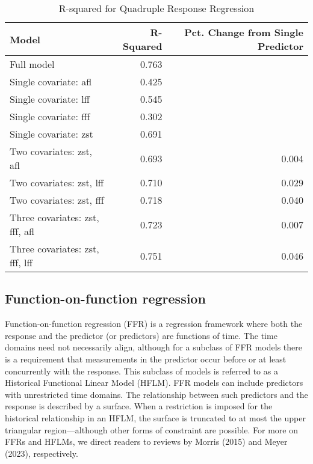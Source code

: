 \begin{table}

\caption{\label{tab:M4}R-squared for Quadruple Response Regression}
\centering
\begin{tabular}[t]{l|r|r}
\hline
Model & R-Squared & Pct. Change from Single Predictor\\
\hline
Full model & 0.763 & \\
\hline
Single covariate: afl & 0.425 & \\
\hline
Single covariate: lff & 0.545 & \\
\hline
Single covariate: fff & 0.302 & \\
\hline
Single covariate: zst & 0.691 & \\
\hline
Two covariates: zst, afl & 0.693 & 0.004\\
\hline
Two covariates: zst, lff & 0.710 & 0.029\\
\hline
Two covariates: zst, fff & 0.718 & 0.040\\
\hline
Three covariates: zst, fff, afl & 0.723 & 0.007\\
\hline
Three covariates: zst, fff, lff & 0.751 & 0.046\\
\hline
\end{tabular}
\end{table}

\hypertarget{function-on-function-regression}{%
\subsection{Function-on-function regression}\label{function-on-function-regression}}

Function-on-function regression (FFR) is a regression framework where both the response and the predictor (or predictors) are functions of time. The time domains need not necessarily align, although for a subclass of FFR models there is a requirement that measurements in the predictor occur before or at least concurrently with the response. This subclass of models is referred to as a Historical Functional Linear Model (HFLM). FFR models can include predictors with unrestricted time domains. The relationship between such predictors and the response is described by a surface. When a restriction is imposed for the historical relationship in an HFLM, the surface is truncated to at most the upper triangular region---although other forms of constraint are possible. For more on FFRs and HFLMs, we direct readers to reviews by Morris (2015) and Meyer (2023), respectively.

